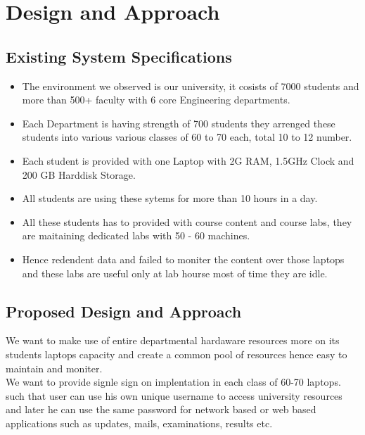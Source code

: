 \documentclass[12pt]{report}
\begin{document}
\chapter{Design and Approach}

\section{Existing System Specifications}


\begin{itemize}
	\item The environment we observed is our university, it cosists of 7000 students and more than 500+ faculty with 6 core Engineering departments.
	\item Each Department is having strength of 700 students they arrenged these students into various various classes of 60 to 70 each, total 10 to 12 number. 
	\item Each student is provided with one Laptop with 2G RAM, 1.5GHz Clock and 200 GB Harddisk Storage. 
	\item All students are using these sytems for more than 10 hours in a day.
	\item All these students has to provided with course content and course labs, they are maitaining dedicated labs with 50 - 60 machines.
	\item Hence redendent data and failed to moniter the content over those laptops and these labs are useful only at lab hourse most of time they are idle.
\end{itemize}	

\section{Proposed Design and Approach}

	We want to make use of entire departmental hardaware resources more on its students laptops capacity and create a common pool of resources hence easy to maintain and moniter.\\
	
	We want to provide signle sign on implentation in each class of 60-70 laptops. such that user can use his own unique username to access university resources and later he can use the same password for network based or web based applications such as updates, mails, examinations, results etc.\newline
	
\end{document}
